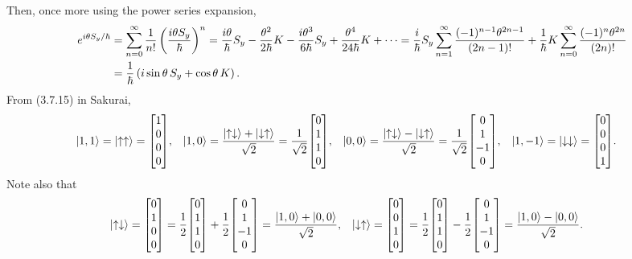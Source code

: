 \begin{solution}
	Then, once more using the power series expansion,
	\begin{align*}
		e^{i \theta S_y / \hbar} &= \sum_{n = 0}^\infty \frac{1}{n!} \left( \frac{i \theta S_y}{\hbar} \right)^n
		= \frac{i \theta}{\hbar} S_y - \frac{\theta^2}{2 \hbar} K - \frac{i \theta^3}{6 \hbar} S_y + \frac{\theta^4}{24 \hbar} K + \cdots
		= \frac{i}{\hbar} S_y \sum_{n = 1}^\infty \frac{(-1)^{n-1} \theta^{2n - 1}}{(2n - 1)!} + \frac{1}{\hbar} K \sum_{n = 0}^\infty \frac{(-1)^n \theta^{2n}}{(2n)!} \\
		&= \frac{1}{\hbar} \left( i \sin{\theta} \, S_y + \cos{\theta} \, K \right).
	\end{align*}
	From (3.7.15) in Sakurai,
	\begin{align*}
		\kqq &= \kuu = \mqty[ 1 \\ 0 \\ 0 \\ 0 ], &
		\kqo &= \frac{\kud + \kdu}{\sqrt{2}} = \frac{1}{\sqrt{2}} \mqty[ 0 \\ 1 \\ 1 \\ 0 ], &
		\koo &= \frac{\kud - \kdu}{\sqrt{2}} = \frac{1}{\sqrt{2}} \mqty[ 0 \\ 1 \\ -1 \\ 0 ], &
		\kqnq &= \kdd = \mqty[ 0 \\ 0 \\ 0 \\ 1 ].
	\end{align*}
	Note also that
	\begin{align*}
		\kud &= \mqty[ 0 \\ 1 \\ 0 \\ 0 ] = \frac{1}{2} \mqty[ 0 \\ 1 \\ 1 \\ 0 ] + \frac{1}{2} \mqty[ 0 \\ 1 \\ -1 \\ 0 ] = \frac{\kqo + \koo}{\sqrt{2}}, &
		\kdu &= \mqty[ 0 \\ 0 \\ 1 \\ 0 ] = \frac{1}{2} \mqty[ 0 \\ 1 \\ 1 \\ 0 ] - \frac{1}{2} \mqty[ 0 \\ 1 \\ -1 \\ 0 ] = \frac{\kqo - \koo}{\sqrt{2}}.
	\end{align*}

\end{solution}
